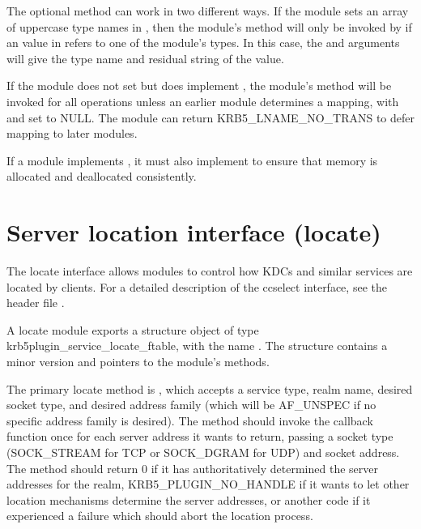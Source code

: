 \documentclass[letterpaper,10pt,english]{sphinxmanual}
\begin{document}
The optional  method can work in two different ways.  If the
module sets an array of uppercase type names in , then
the module’s  method will only be invoked by
 if an  value in
 refers to one of the module’s types.  In this
case, the  and  arguments will give the type name and
residual string of the  value.

If the module does not set  but does implement
, the module’s  method will be invoked for all
 operations unless an earlier module
determines a mapping, with  and  set to NULL.  The
module can return KRB5\_LNAME\_NO\_TRANS to defer mapping to later
modules.

If a module implements , it must also implement
 to ensure that memory is allocated and deallocated
consistently.


\section{Server location interface (locate)}
\label{\detokenize{plugindev/locate:server-location-interface-locate}}\label{\detokenize{plugindev/locate::doc}}
The locate interface allows modules to control how KDCs and similar
services are located by clients.  For a detailed description of the
ccselect interface, see the header file .

A locate module exports a structure object of type
krb5plugin\_service\_locate\_ftable, with the name .
The structure contains a minor version and pointers to the module’s
methods.

The primary locate method is , which accepts a service type,
realm name, desired socket type, and desired address family (which
will be AF\_UNSPEC if no specific address family is desired).  The
method should invoke the callback function once for each server
address it wants to return, passing a socket type (SOCK\_STREAM for TCP
or SOCK\_DGRAM for UDP) and socket address.  The  method
should return 0 if it has authoritatively determined the server
addresses for the realm, KRB5\_PLUGIN\_NO\_HANDLE if it wants to let
other location mechanisms determine the server addresses, or another
code if it experienced a failure which should abort the location
process.
\end{document}
